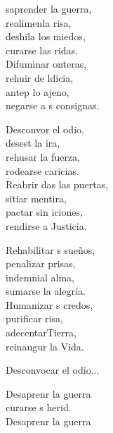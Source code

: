 \begin{cancion}%
	saprender la guerra, \\
	realimenla risa, \\
	deshila los miedos, \\
	curarse las ridas. \\
	Difuminar onteras,\\
	rehuir de ldicia, \\
	antep lo ajeno,\\
	negarse a s consignas. \jump\\
	\begin{chorus}%
		Desconvor el odio,\\
		desest la ira, \\
		rehusar  la fuerza, \\
		rodearse  caricias. \\
		Reabrir das las puertas, \\
		sitiar  mentira, \\
		pactar sin iciones,\\
		rendirse a  Justicia.\jump\\
	\end{chorus}%
	Rehabilitar s sueños, \\
	penalizar prisas, \\
	indemnial alma, \\
	sumarse la alegría. \\
	Humanizar s credos, \\
	purificar risa, \\
	adecentarTierra,\\
	reinaugur la Vida. \jump\\
	\begin{chorus}%
	Desconvocar el odio... \jump\\
	\end{chorus}%
	Desaprenr la guerra\\
	curarse s herid. \\
	Desaprenr la guerra\\

\end{cancion}
